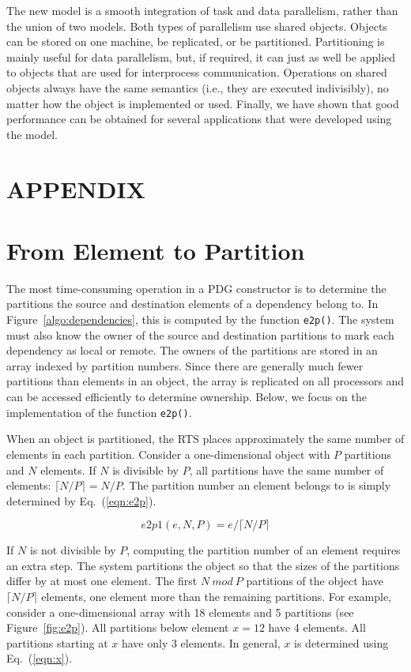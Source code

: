 \documentclass{acmtrans2e}
\begin{document}
The new model is a smooth integration of task and data parallelism,
rather than the union of two models. Both types of parallelism use
shared objects. Objects can be stored on one machine, be replicated,
or be partitioned. Partitioning is mainly useful for data parallelism,
but, if required, it can just as well be applied to objects that are
used for interprocess communication.  Operations on shared objects
always have the same semantics (i.e., they are executed indivisibly),
no matter how the object is implemented or used. Finally,
we have shown that good performance can be obtained for
several applications that were developed using the model.

\appendix
\section*{APPENDIX}
\section*{From Element to Partition}
\label{app:e2p}
\setcounter{section}{1}

The most time-consuming operation in a PDG constructor is to determine
the partitions the source and destination elements of a dependency
belong to. In Figure~\ref{algo:dependencies}, this is computed by the
function \verb+e2p()+. The system must also know the owner of the
source and destination partitions to mark each dependency as local or
remote.  The owners of the partitions are stored in an array indexed
by partition numbers. Since there are generally much fewer partitions
than elements in an object, the array is replicated on all processors
and can be accessed efficiently to determine ownership.  Below, we
focus on the implementation of the function \verb+e2p()+.

When an object is partitioned, the RTS places approximately the same
number of elements in each partition. Consider a one-dimensional
object with $P$ partitions and $N$ elements. If $N$ is divisible by
$P$, all partitions have the same number of elements: $\lceil N / P
\rceil = N/P$. The partition number an element belongs to is simply
determined by Eq.~(\ref{eqn:e2p}).

\begin{equation}
e2p1(e,N,P) = e / \lceil N / P \rceil  \label{eqn:e2p}
\end{equation}

If $N$ is not divisible by $P$, computing the partition number of an
element requires an extra step.
The system partitions the object so that the
sizes of the partitions differ by at most one element.
The first $N~ mod ~P$ partitions of
the object have $\lceil N / P \rceil$ elements, one element more than
the remaining partitions. For example, consider a
one-dimensional array with 18 elements and 5 partitions (see
Figure~\ref{fig:e2p}). All partitions below element $x=12$ have 4
elements. All partitions starting at $x$ have only 3 elements. In
general, $x$ is determined using Eq.~(\ref{eqn:x}).
\end{document}
